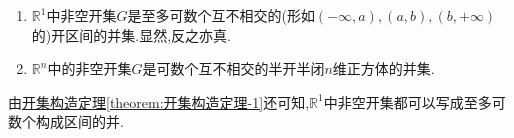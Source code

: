 \documentclass[../../main.tex]{subfiles}%
\begin{document}
\begin{theorem}\label{theorem:开集构造定理}
\begin{enumerate}[(1)]
\item\label{theorem:开集构造定理-1} $\mathbb{R}^1$中非空开集$G$是至多可数个互不相交的(形如$(-\infty,a),(a,b),(b,+\infty)$的)开区间的并集.显然,反之亦真.

\item\label{theorem:开集构造定理-2} $\mathbb{R}^n$中的非空开集$G$是可数个互不相交的半开半闭$n$维正方体的并集.
\end{enumerate}
\end{theorem}
\begin{note}
由\hyperref[theorem:开集构造定理]{开集构造定理\ref{theorem:开集构造定理-1}}还可知,$\mathbb{R}^1$中非空开集都可以写成至多可数个构成区间的并.
\end{note}
\end{document}
